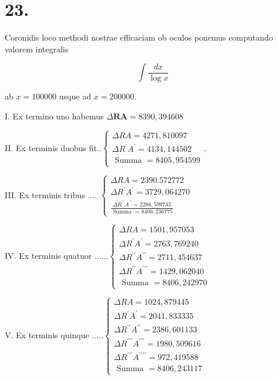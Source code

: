 \documentclass[10pt]{article}
\begin{document}
\section*{23.}
Coronidis loco methodi nostrae efficaciam ob oculos ponemus computando valorem integralis

\[
\int \frac{d x}{\log x}
\]

ab \(x=100000\) usque ad \(x=200000\).

I. Ex termino uno habemus \(\Delta \boldsymbol{R} \boldsymbol{A}=8390,394608\)

II. Ex terminis duobus fit..\(\left\{\begin{array}{l}\Delta R A=4271,810097 \\ \Delta R^{\prime} A^{\prime}=4134,144502 \\ \hline \text { Summa }=8405,954599\end{array}\right.\).

III. Ex terminis tribus .... \(\left\{\begin{array}{l}\Delta R A=2390.572772 \\ \Delta R^{\prime} A^{\prime}=3729,064270 \\ \frac{\Delta R^{\prime \prime} A^{\prime \prime}=2286,599733}{\text { Summa }=8406,236775}\end{array}\right.\)

IV. Ex terminis quatuor \(\ldots \ldots\left\{\begin{array}{l}\Delta R A=1501,957053 \\ \Delta R^{\prime} A^{\prime}=2763,769240 \\ \Delta R^{\prime \prime} A^{\prime \prime}=2711,454637 \\ \Delta R^{\prime \prime} A^{\prime \prime \prime}=1429,062040 \\ \text { Summa }=8406,242970\end{array}\right.\)

V. Ex terminis quinque \(\ldots . .\left\{\begin{array}{l}\Delta R A=1024,879445 \\ \Delta R^{\prime} A^{\prime}=2041,833335 \\ \Delta R^{\prime \prime} A^{\prime \prime}=2386,601133 \\ \Delta R^{\prime \prime \prime} A^{\prime \prime \prime}=1980,509616 \\ \Delta R^{\prime \prime \prime} A^{\prime \prime \prime \prime}=972,419588 \\ \hline \text { Summa }=8406,243117\end{array}\right.\)
\end{document}
